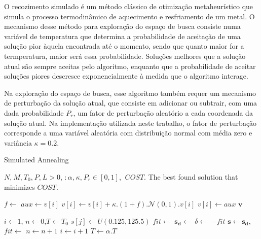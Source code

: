 O  recozimento simulado é um método clássico de otimização metaheurístico que simula o processo termodinâmico de aquecimento e resfriamento de um metal. O mecanismo desse método para exploração do espaço de busca consiste numa variável de temperatura que determina a probabilidade de aceitação de uma solução pior àquela encontrada até o momento, sendo que quanto maior for a termperatura, maior será essa probabilidade. Soluções melhores que a solução atual são sempre aceitas pelo algoritmo, enquanto que a probabilidade de aceitar soluções piores descresce exponencialmente à medida que o algoritmo interage.  

Na exploração do espaço de busca, esse algoritmo também requer um mecanismo de perturbação da solução atual, que consiste em adicionar ou subtrair, com uma dada probabilidade $P_r$, um fator de perturbação aleatório a cada coordenada da solução atual. Na implementação utilizada neste trabalho, o fator de perturbação corresponde a uma variável aleatória com distribuição normal com média zero e variância $\kappa = 0.2$.

\begin{algorithm}[ht]
\caption{Simulated Annealing}
\label{alg:sa}
\begin{algorithmic}
\Require $N\text{,}\:M\text{,}\:T_0\text{,}\:P\text{,}\:L> 0$, $:\alpha\text{,}\:\kappa\text{,}\:P_r \in [0,1]$, $\:COST$.
\Ensure The best found solution that minimizes $COST$.

\State $f \gets$ 
\State $aux \gets v[i]$
\State $v[i] \gets v[i]+ \kappa.(1+f).\mathcal{N}(0,1).v[i]$
\State $v[i] \gets aux$
\EndIf
\EndIf
\EndFor
\State \Return $\boldsymbol{v}$
\EndFunction

\State $i \gets 1$, $n \gets 0$,$T \gets T_0$
\State $s[j] \gets U(0.125,125.5)$
\EndFor
\State $fit \gets$  
\Repeat
\State $\boldsymbol{s_d} \gets$ 
\State $\delta \gets$ $- fit$ 
\State $\boldsymbol{s} \gets \boldsymbol{s_d}$,$fit \gets $ 
$n \gets n + 1$
\EndIf
\State $i \gets i + 1$
\State $T \gets \alpha.T$
\end{algorithmic}
\end{algorithm}

